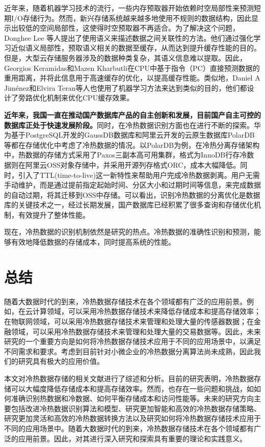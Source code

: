 \documentclass{article}
\begin{document}
近年来，随着机器学习技术的流行，一些内存预取器开始依赖时空局部性来预测短期I/O存储行为。然而，新兴存储系统越来越多地使用不规则的数据结构，因此显示出较低的空间局部性，这使得时空预取器不再适合。为了解决这个问题，Donghee Lee \textsuperscript{\cite{8}}等人提出了使用语义来描述数据之间关联性的方法。他们通过强化学习近似语义局部性，预取语义相关的数据至缓存，从而达到提升缓存性能的目的。但是，大型云存储服务器涉及的数据种类复杂，其语义信息难以提取。因此，Georgios Keramidas\textsuperscript{\cite{9}}和Mazen Kharbutli\textsuperscript{\cite{10}}在CPU中基于指令（PC）直接预测数据的重用距离，并将此信息用于高速缓存的优化，以提高缓存性能。类似地，Daniel A Jiménez\textsuperscript{\cite{11}}和Elvira Teran\textsuperscript{\cite{12}}等人也使用了机器学习方法来达到类似的目的，他们都设计了旁路优化机制来优化CPU缓存效果。

\textbf{近年来，我国一直在推动国产数据库产品的自主创新和发展，目前国产自主可控的数据库正处于快速发展阶段。}同时，在冷热数据识别方面也在进行不断的探索。华为基于PostgreSQL开发的GaussDB数据库和阿里云开发的云原生数据库PolarDB等都在存储优化中考虑了冷热数据的情况。以PolarDB为例，在冷热分离存储架构中，热数据的存储方式采用了Paxos三副本高可用集群，格式为InnoDB行存冷数据则在阿里云OSS对象存储中，并采用开源列存格式ORC，成本大幅降低。同时，引入了TTL(time-to-live)这一新特性来帮助用户完成冷热数据剥离。用户无需手动维护，而是通过提前指定起始时间、分区大小和过期时间等信息，来完成数据的自动过期，将其迁移到OSS中存储。可以看出，识别冷热数据的分离优化是数据库的关键技术之一，经过长期发展，国产数据库已经积累了很多查询和存储优化机制，有效提升了整体性能。

现在，冷热数据的识别机制依然是研究的热点。冷热数据的准确性识别和预测，能够有效地降低数据的存储成本，同时提高系统的性能。

\section{总结}
随着大数据时代的到来，冷热数据存储技术在各个领域都有广泛的应用前景。例如，在云计算领域，可以采用冷热数据存储技术来降低存储成本和提高存储效率；在物联网领域，可以采用冷热数据存储技术来管理和处理大量的传感器数据；在金融领域，可以采用冷热数据存储技术来管理和处理大量的交易数据等。因此，未来研究的一个重要方向是如何将冷热数据存储技术应用于不同的应用场景中，以满足不同需求和要求。考虑到目前针对小微企业的冷热数据分离算法尚未成熟，因此我们的研究具有极大的应用价值。

本文对冷热数据存储的相关文献进行了综述和分析。目前的研究表明，冷热数据存储可以大幅度降低存储成本和提高存储效率。然而，也存在一些问题和挑战，如如何准确识别热数据和冷数据、如何平衡存储成本和访问性能等。未来的研究方向主要包括改进冷热数据识别算法和模型、研究更加智能和高效的冷热数据存储策略、研究更加灵活和高效的冷热数据转换方法以及研究如何将冷热数据存储技术应用于不同的应用场景中。随着大数据时代的到来，冷热数据存储技术在各个领域都有广泛的应用前景。因此，对其进行深入研究和探索具有重要的理论和实践意义。



\end{document}
